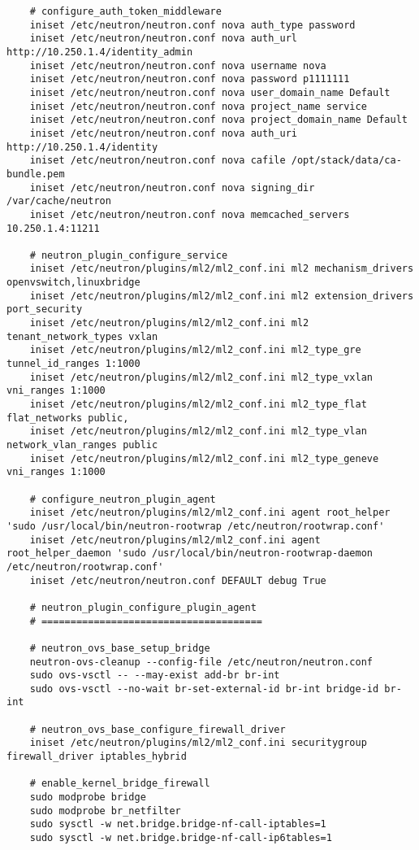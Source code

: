 \documentclass[a4paper,left=1.5cm,right=1.5cm,11pt]{article}
\begin{document}
\begin{lstlisting}
	# configure_auth_token_middleware
	iniset /etc/neutron/neutron.conf nova auth_type password
	iniset /etc/neutron/neutron.conf nova auth_url http://10.250.1.4/identity_admin
	iniset /etc/neutron/neutron.conf nova username nova
	iniset /etc/neutron/neutron.conf nova password p1111111
	iniset /etc/neutron/neutron.conf nova user_domain_name Default
	iniset /etc/neutron/neutron.conf nova project_name service
	iniset /etc/neutron/neutron.conf nova project_domain_name Default
	iniset /etc/neutron/neutron.conf nova auth_uri http://10.250.1.4/identity
	iniset /etc/neutron/neutron.conf nova cafile /opt/stack/data/ca-bundle.pem
	iniset /etc/neutron/neutron.conf nova signing_dir /var/cache/neutron
	iniset /etc/neutron/neutron.conf nova memcached_servers 10.250.1.4:11211

	# neutron_plugin_configure_service
	iniset /etc/neutron/plugins/ml2/ml2_conf.ini ml2 mechanism_drivers openvswitch,linuxbridge
	iniset /etc/neutron/plugins/ml2/ml2_conf.ini ml2 extension_drivers port_security
	iniset /etc/neutron/plugins/ml2/ml2_conf.ini ml2 tenant_network_types vxlan
	iniset /etc/neutron/plugins/ml2/ml2_conf.ini ml2_type_gre tunnel_id_ranges 1:1000
	iniset /etc/neutron/plugins/ml2/ml2_conf.ini ml2_type_vxlan vni_ranges 1:1000
	iniset /etc/neutron/plugins/ml2/ml2_conf.ini ml2_type_flat flat_networks public,
	iniset /etc/neutron/plugins/ml2/ml2_conf.ini ml2_type_vlan network_vlan_ranges public
	iniset /etc/neutron/plugins/ml2/ml2_conf.ini ml2_type_geneve vni_ranges 1:1000

	# configure_neutron_plugin_agent
	iniset /etc/neutron/plugins/ml2/ml2_conf.ini agent root_helper 'sudo /usr/local/bin/neutron-rootwrap /etc/neutron/rootwrap.conf'
	iniset /etc/neutron/plugins/ml2/ml2_conf.ini agent root_helper_daemon 'sudo /usr/local/bin/neutron-rootwrap-daemon /etc/neutron/rootwrap.conf'
	iniset /etc/neutron/neutron.conf DEFAULT debug True

	# neutron_plugin_configure_plugin_agent
	# ======================================

	# neutron_ovs_base_setup_bridge
	neutron-ovs-cleanup --config-file /etc/neutron/neutron.conf
	sudo ovs-vsctl -- --may-exist add-br br-int
	sudo ovs-vsctl --no-wait br-set-external-id br-int bridge-id br-int
	
	# neutron_ovs_base_configure_firewall_driver
	iniset /etc/neutron/plugins/ml2/ml2_conf.ini securitygroup firewall_driver iptables_hybrid
	
	# enable_kernel_bridge_firewall
	sudo modprobe bridge
	sudo modprobe br_netfilter
	sudo sysctl -w net.bridge.bridge-nf-call-iptables=1
	sudo sysctl -w net.bridge.bridge-nf-call-ip6tables=1


\end{lstlisting}
\end{document}
